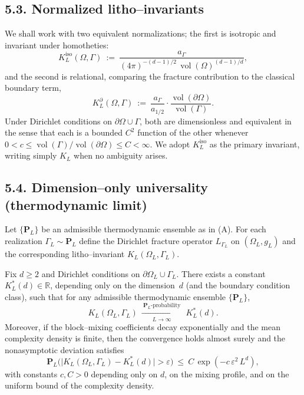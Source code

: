 \subsection*{5.3. Normalized litho–invariants}
We shall work with two equivalent normalizations; the first is isotropic and invariant under homotheties:
\[
K_L^{\mathrm{iso}}(\Omega,\Gamma)\ :=\ \frac{a_\Gamma}{(4\pi)^{-(d-1)/2}\,\operatorname{vol}(\Omega)^{(d-1)/d}},
\]
and the second is relational, comparing the fracture contribution to the classical boundary term,
\[
K_L^{\partial}(\Omega,\Gamma)\ :=\ \frac{a_\Gamma}{a_{1/2}}\cdot \frac{\operatorname{vol}(\partial\Omega)}{\operatorname{vol}(\Gamma)}.
\]
Under Dirichlet conditions on $\partial\Omega\cup\Gamma$, both are dimensionless and equivalent in the sense that each is a bounded $C^2$ function of the other whenever $0<c\le\operatorname{vol}(\Gamma)/\operatorname{vol}(\partial\Omega)\le C<\infty$.
We adopt $K_L^{\mathrm{iso}}$ as the primary invariant, writing simply $K_L$ when no ambiguity arises.

\subsection*{5.4. Dimension–only universality (thermodynamic limit)}
Let $\{\mathbf{P}_L\}$ be an admissible thermodynamic ensemble as in (A). For each realization $\Gamma_L\sim\mathbf{P}_L$ define the Dirichlet fracture operator $L_{\Gamma_L}$ on $(\Omega_L,g_L)$ and the corresponding litho–invariant $K_L(\Omega_L,\Gamma_L)$.

\begin{theorem}\label{thm:LLN-thermo}
Fix $d\ge2$ and Dirichlet conditions on $\partial\Omega_L\cup\Gamma_L$. There exists a constant $K^*_L(d)\in\mathbb{R}$, depending only on the dimension~$d$ (and the boundary condition class), such that for any admissible thermodynamic ensemble $\{\mathbf{P}_L\}$,
\[
K_L(\Omega_L,\Gamma_L)\ \xrightarrow[L\to\infty]{\ \mathbf{P}_L\text{-probability}\ }\ K^*_L(d).
\]
Moreover, if the block–mixing coefficients decay exponentially and the mean complexity density is finite, then the convergence holds almost surely and the nonasymptotic deviation satisfies
\[
\mathbf{P}_L\Big( \big|K_L(\Omega_L,\Gamma_L)-K^*_L(d)\big|>\varepsilon\Big)\ \le\
C\,\exp\!\left(-c\,\varepsilon^2\,L^d\right),
\]
with constants $c,C>0$ depending only on $d$, on the mixing profile, and on the uniform bound of the complexity density.
\end{theorem}

